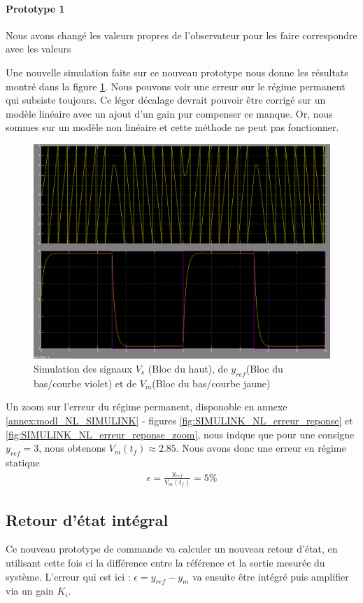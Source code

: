 \paragraph{Prototype 1}
Nous avons changé les valeurs propres de l'observateur pour les faire correspondre avec les valeurs 				
			
		
Une nouvelle simulation faite sur ce nouveau prototype nous donne les résultats montré dans la figure \ref{fig:SimuNL_ref_sortieVS_VM}. Nous pouvons voir une erreur sur le régime permanent qui subsiste toujours. Ce léger décalage devrait pouvoir être corrigé sur un modèle linéaire avec un ajout d'un gain pur compenser ce manque. Or, nous sommes sur un modèle non linéaire et cette méthode ne peut pas fonctionner. 
\begin{figure}
		\begin{center}
		\includegraphics[width= .8\textwidth]{./IV/images/NL_Position--ref_sortie_RE.PNG}
		\caption{Simulation des signaux $V_s$ (Bloc du haut), de $y_{ref}$(Bloc du bas/courbe violet) et de $V_m$(Bloc du bas/courbe jaune)\label{fig:SimuNL_ref_sortieVS_VM} }
		\end{center}	
\end{figure}	
		
		Un zoom sur l'erreur du régime permanent, disponoble en annexe \ref{annex:modl_NL_SIMULINK} - figures \ref{fig:SIMULINK_NL_erreur_reponse} et \ref{fig:SIMULINK_NL_erreur_reponse_zoom}, nous indque que pour une consigne $y_{ref} = 3$, nous obtenons $V_m(t_f)\approx 2.85$. Nous avons donc une erreur en régime statique \begin{align*}
		\epsilon = \frac{y_{ref}}{V_m(t_f)} = 5\%
		\end{align*}
		\subsection{Retour d'état intégral}
		Ce nouveau prototype de commande va calculer un nouveau retour d'état, en utilisant cette fois ci la différence entre la référence et la sortie mesurée du système. L'erreur qui est ici : $\epsilon = y_{ref} - y_m$ va ensuite être intégré puis amplifier via un gain $K_i$.
